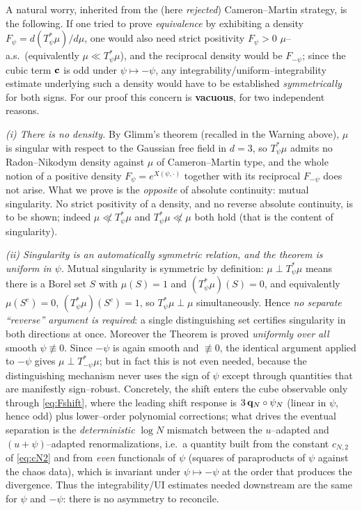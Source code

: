 \begin{remark}\label{rem:symmetry}
A natural worry, inherited from the (here \emph{rejected}) Cameron--Martin
strategy, is the following. If one tried to prove \emph{equivalence} by exhibiting
a density $F_\psi=d(T_\psi^*\mu)/d\mu$, one would also need strict positivity
$F_\psi>0$ $\mu$--a.s.\ (equivalently $\mu\ll T_\psi^*\mu$), and the reciprocal
density would be $F_{-\psi}$; since the cubic term $\mathbf{c}$ is odd under
$\psi\mapsto-\psi$, any integrability/uniform--integrability estimate underlying
such a density would have to be established \emph{symmetrically} for both signs.
For our proof this concern is \textbf{vacuous}, for two independent reasons.

\smallskip
\emph{(i) There is no density.} By Glimm's theorem (recalled in the Warning above),
$\mu$ is singular with respect to the Gaussian free field in $d=3$, so $T_\psi^*\mu$
admits no Radon--Nikodym density against $\mu$ of Cameron--Martin type, and the whole
notion of a positive density $F_\psi=e^{X(\psi,\cdot)}$ together with its reciprocal
$F_{-\psi}$ does not arise. What we prove is the \emph{opposite} of absolute
continuity: mutual singularity. No strict positivity of a density, and no reverse
absolute continuity, is to be shown; indeed $\mu\not\ll T_\psi^*\mu$ and
$T_\psi^*\mu\not\ll\mu$ both hold (that is the content of singularity).

\smallskip
\emph{(ii) Singularity is an automatically symmetric relation, and the theorem is
uniform in $\psi$.} Mutual singularity is symmetric by definition: $\mu\perp T_\psi^*
\mu$ means there is a Borel set $S$ with $\mu(S)=1$ and $(T_\psi^*\mu)(S)=0$, and
equivalently $\mu(S^c)=0$, $(T_\psi^*\mu)(S^c)=1$, so $T_\psi^*\mu\perp\mu$
simultaneously. Hence \emph{no separate ``reverse'' argument is required}: a single
distinguishing set certifies singularity in both directions at once. Moreover the
Theorem is proved \emph{uniformly over all} smooth $\psi\not\equiv0$. Since $-\psi$ is
again smooth and $\not\equiv0$, the identical argument applied to $-\psi$ gives
$\mu\perp T_{-\psi}^*\mu$; but in fact this is not even needed, because the
distinguishing mechanism never uses the sign of $\psi$ except through quantities that
are manifestly sign--robust. Concretely, the shift enters the cube observable only
through \eqref{eq:Fshift}, where the leading shift response is
$3\,\mathbf{q}_N\circ\psi_N$ (linear in $\psi$, hence odd) plus lower--order polynomial
corrections; what drives the eventual separation is the \emph{deterministic}
$\log N$ mismatch between the $u$--adapted and $(u+\psi)$--adapted renormalizations,
i.e.\ a quantity built from the constant $c_{N,2}$ of \eqref{eq:cN2} and from
\emph{even} functionals of $\psi$ (squares of paraproducts of $\psi$ against the
chaos data), which is invariant under $\psi\mapsto-\psi$ at the order that produces
the divergence. Thus the integrability/UI estimates needed downstream are the same for
$\psi$ and $-\psi$: there is no asymmetry to reconcile.


\end{remark}
